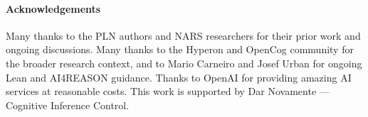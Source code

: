 \documentclass{easychair}
\begin{document}
\vspace{-3mm}
\paragraph*{Acknowledgements}
Many thanks to the PLN authors and NARS researchers for their prior work and ongoing discussions.
Many thanks to the Hyperon and OpenCog community for the broader research context, and to Mario Carneiro and Josef Urban for ongoing Lean and AI4REASON guidance.
Thanks to OpenAI for providing amazing AI services at reasonable costs.
This work is supported by Dar Novamente --- Cognitive Inference Control.



\newpage
\vspace{-3mm}


\end{document}
